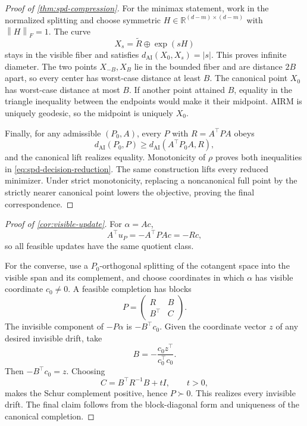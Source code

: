 \documentclass[10pt]{article}
\theoremstyle{plain}
\theoremstyle{definition}
\theoremstyle{remark}
\newcommand{\R}{\mathbb R}
\newcommand{\AI}{\mathrm{AI}}
\newcommand{\fro}[1]{\left\lVert #1\right\rVert_F}
\newcommand{\dai}{d_{\AI}}
\begin{document}
\begin{proof}[Proof of \cref{thm:spd-compression}]
For the minimax statement, work in the normalized splitting and choose
symmetric \(H\in\R^{(d-m)\times(d-m)}\) with \(\fro H=1\).  The curve
\[
  X_s=\widetilde R\oplus\exp(sH)
\]
stays in the visible fiber and satisfies
\(\dai(X_0,X_s)=|s|\).  This proves infinite diameter.  The two points
\(X_{-B},X_B\) lie in the bounded fiber and are distance \(2B\) apart, so
every center has worst-case distance at least \(B\).  The canonical point
\(X_0\) has worst-case distance at most \(B\).  If another point attained
\(B\), equality in the triangle inequality between the endpoints would make
it their midpoint.  AIRM is uniquely geodesic, so the midpoint is uniquely
\(X_0\).

Finally, for any admissible \((P_0,A)\), every \(P\) with
\(R=A^\top PA\) obeys
\[
  \dai(P_0,P)\ge\dai(A^\top P_0A,R),
\]
and the canonical lift realizes equality.  Monotonicity of \(\rho\) proves
both inequalities in \eqref{eq:spd-decision-reduction}.  The same construction
lifts every reduced minimizer.  Under strict monotonicity, replacing a
noncanonical full point by the strictly nearer canonical point lowers the
objective, proving the final correspondence.
\end{proof}

\begin{proof}[Proof of \cref{cor:visible-update}]
For \(\alpha=Ac\),
\[
  A^\top u_P=-A^\top PA c=-Rc,
\]
so all feasible updates have the same quotient class.

For the converse, use a \(P_0\)-orthogonal splitting of the cotangent space
into the visible span and its complement, and choose coordinates in which
\(\alpha\) has visible coordinate \(c_0\ne0\).  A feasible completion has
blocks
\[
  P=\begin{pmatrix}R&B\\B^\top&C\end{pmatrix}.
\]
The invisible component of \(-P\alpha\) is \(-B^\top c_0\).  Given the
coordinate vector \(z\) of any desired invisible drift, take
\[
  B=-\frac{c_0z^\top}{c_0^\top c_0}.
\]
Then \(-B^\top c_0=z\).  Choosing
\[
  C=B^\top R^{-1}B+tI,
  \qquad t>0,
\]
makes the Schur complement positive, hence \(P\succ0\).  This realizes every
invisible drift.  The final claim follows from the block-diagonal form and
uniqueness of the canonical completion.
\end{proof}
\end{document}
